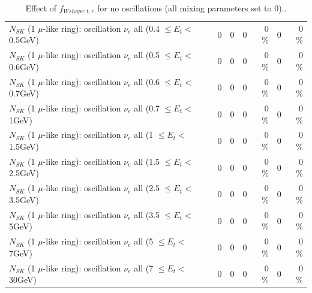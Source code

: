 \begin{table}
\begin{tabular}{| l | r | r | r  r | r  r |}
$N_{SK}$ (1 $\mu$-like ring): oscillation $\nu_{e}$ all (0.4 $\leq E_{t} <$ 0.5GeV) &               0 &               0 &               0 &        0 \%  &               0 &        0 \%  \\ 
$N_{SK}$ (1 $\mu$-like ring): oscillation $\nu_{e}$ all (0.5 $\leq E_{t} <$ 0.6GeV) &               0 &               0 &               0 &        0 \%  &               0 &        0 \%  \\ 
$N_{SK}$ (1 $\mu$-like ring): oscillation $\nu_{e}$ all (0.6 $\leq E_{t} <$ 0.7GeV) &               0 &               0 &               0 &        0 \%  &               0 &        0 \%  \\ 
$N_{SK}$ (1 $\mu$-like ring): oscillation $\nu_{e}$ all (0.7 $\leq E_{t} <$ 1GeV) &               0 &               0 &               0 &        0 \%  &               0 &        0 \%  \\ 
$N_{SK}$ (1 $\mu$-like ring): oscillation $\nu_{e}$ all (1 $\leq E_{t} <$ 1.5GeV) &               0 &               0 &               0 &        0 \%  &               0 &        0 \%  \\ 
$N_{SK}$ (1 $\mu$-like ring): oscillation $\nu_{e}$ all (1.5 $\leq E_{t} <$ 2.5GeV) &               0 &               0 &               0 &        0 \%  &               0 &        0 \%  \\ 
$N_{SK}$ (1 $\mu$-like ring): oscillation $\nu_{e}$ all (2.5 $\leq E_{t} <$ 3.5GeV) &               0 &               0 &               0 &        0 \%  &               0 &        0 \%  \\ 
$N_{SK}$ (1 $\mu$-like ring): oscillation $\nu_{e}$ all (3.5 $\leq E_{t} <$ 5GeV) &               0 &               0 &               0 &        0 \%  &               0 &        0 \%  \\ 
 $N_{SK}$ (1 $\mu$-like ring): oscillation $\nu_{e}$ all (5 $\leq E_{t} <$ 7GeV) &               0 &               0 &               0 &        0 \%  &               0 &        0 \%  \\ 
$N_{SK}$ (1 $\mu$-like ring): oscillation $\nu_{e}$ all (7 $\leq E_{t} <$ 30GeV) &               0 &               0 &               0 &        0 \%  &               0 &        0 \%  \\ 
\hline
\hline
\end{tabular}
\caption{ Effect of $f_{Wshape; t, r}$ for no oscillations (all mixing parameters set to 0).. }
\label{tab:num_xsec_wshape_1RmuT_3f_osc_t13:0}
\end{table}
\clearpage
